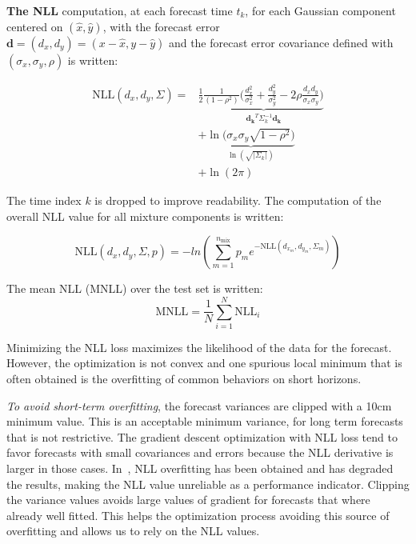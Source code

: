 \documentclass[a4paper, 10pt, conference]{ieeeconf}      %
\begin{document}
\textbf{The NLL} computation, at each forecast time $t_k$, for each Gaussian component centered on $(\hat{x}, \hat{y})$,  with the forecast
error\\
$\mathbf{d} = (d_x, d_y) = (x - \hat{x}, y -\hat{y})$ and the forecast error
covariance defined with $(\sigma_x, \sigma_y, \rho)$ is written:

\begin{equation}
    \begin{split}
        \text{NLL}(d_x, d_y, \Sigma) =
        & \frac{1}{2}\underbrace{\frac{1}{(1 - \rho^2)}\biggl(\frac{d_{x}^2}{\sigma_{x}^2} + \frac{d_{y}^2}{\sigma_{y}^2}
        -2 \rho \frac{d_{x} d_{y}}{\sigma_{x} \sigma_{y}}\biggr)
        }_{\mathbf{d_k}^T\Sigma_k^{-1}\mathbf{d_k}}\\
        & + \underbrace{\ln\biggl(\sigma_x\sigma_y\sqrt{1-\rho^2}\biggr)}_{\ln(\sqrt{|\Sigma_k|})}\\
        & + \ln(2\pi)
    \end{split}
    \label{eq_gauss_nll}
\end{equation}

The time index $k$ is dropped to improve readability.
The computation of the overall NLL value for all mixture components is written:

\begin{equation}
    \text{NLL}(d_x, d_y, \Sigma, p) = -ln\left( \sum_{m=1}^{n_{\text{mix}}} p_m e^{-\text{NLL}(d_{x_m}, d_{y_m}, \Sigma_m)} \right)
    \label{eq_multi_nll}
\end{equation}

The mean NLL (MNLL) over the test set is written:
\begin{equation}
    \text{MNLL} = \frac{1}{N}\sum_{i=1}^N{\text{NLL}_i}
\end{equation}

Minimizing the NLL loss maximizes the likelihood of the data for the forecast.
However, the optimization is not convex and one spurious local minimum that is often obtained is
the overfitting of common behaviors on short horizons.

\emph{To avoid short-term overfitting}, the forecast variances are clipped with a 10cm minimum value.
This is an acceptable minimum variance, for long term forecasts that is not restrictive.
The gradient descent optimization with NLL loss tend to favor forecasts with small covariances and errors because the
NLL derivative is larger in those cases.
In~\cite{Lenz2017}, NLL overfitting has been obtained and has degraded the results, making the NLL value unreliable as a
performance indicator.
Clipping the variance values avoids large values of gradient for forecasts that where already well fitted.
This helps the optimization process avoiding this source of overfitting and allows us to rely on the NLL values.
\end{document}
